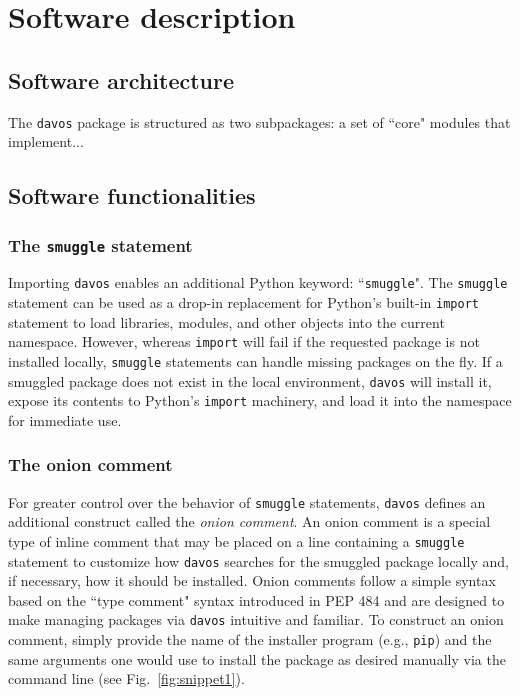 \documentclass[preprint,12pt, a4paper]{elsarticle}
\newcommand{\comment}[1]{}
\begin{document}


\section{Software description}


\subsection{Software architecture}
The \texttt{davos} package is structured as two subpackages: a set of ``core" modules that implement...



\subsection{Software functionalities}%

\subsubsection{The \texttt{smuggle} statement}
Importing \texttt{davos}\comment{in a Jupyter notebook} enables an additional Python keyword: ``\texttt{smuggle}".
The \texttt{smuggle} statement can be used as a drop-in replacement for Python's built-in \texttt{import} statement to load libraries, modules, and other objects into the current namespace.
However, whereas \texttt{import} will fail if the requested package is not installed locally, \texttt{smuggle} statements can handle missing packages on the fly.
If a smuggled package does not exist in the local environment, \texttt{davos} will install it, expose its contents to Python's \texttt{import} machinery, and load it into the namespace for immediate use.


\subsubsection{The onion comment}
For greater control over the behavior of \texttt{smuggle} statements, \texttt{davos} defines an additional construct called the \textit{onion comment}. An onion comment is a special type of inline comment that may be placed on a line containing a \texttt{smuggle} statement to customize how \texttt{davos} searches for the smuggled package locally and, if necessary, how it should be installed. Onion comments follow a simple syntax based on the ``type comment" syntax introduced in PEP 484 \cite{vanREtal14} and are designed to make managing packages via \texttt{davos} intuitive and familiar. To construct an onion comment, simply provide the name of the installer program (e.g., \texttt{pip}) and the same arguments one would use to install the package as desired manually via the command line (see Fig.~\ref{fig:snippet1}).
\end{document}
